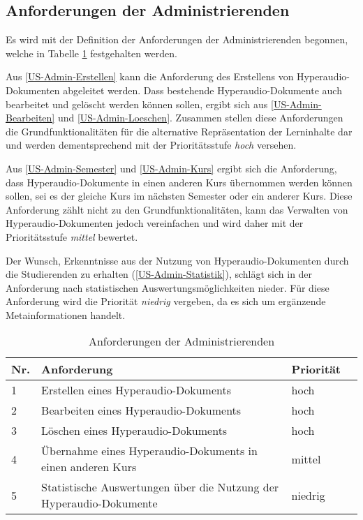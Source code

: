 \subsection{Anforderungen der Administrierenden}
Es wird mit der Definition der Anforderungen der Administrierenden begonnen, welche in Tabelle \ref{tab:AnforderungenAdministrierenden} festgehalten werden. 

Aus \ref{US-Admin-Erstellen} kann die Anforderung des Erstellens von Hyperaudio-Dokumenten abgeleitet werden. Dass bestehende Hyperaudio-Dokumente auch bearbeitet und gelöscht werden können sollen, ergibt sich aus \ref{US-Admin-Bearbeiten} und \ref{US-Admin-Loeschen}. Zusammen stellen diese Anforderungen die Grundfunktionalitäten für die alternative Repräsentation der Lerninhalte dar und werden dementsprechend mit der Prioritätsstufe \textit{hoch} versehen.

Aus \ref{US-Admin-Semester} und \ref{US-Admin-Kurs} ergibt sich die Anforderung, dass Hyperaudio-Dokumente in einen anderen Kurs übernommen werden können sollen, sei es der gleiche Kurs im nächsten Semester oder ein anderer Kurs. Diese Anforderung zählt nicht zu den Grundfunktionalitäten, kann das Verwalten von Hyperaudio-Dokumenten jedoch vereinfachen und wird daher mit der Prioritätsstufe \textit{mittel} bewertet.

Der Wunsch, Erkenntnisse aus der Nutzung von Hyperaudio-Dokumenten durch die Studierenden zu erhalten (\ref{US-Admin-Statistik}), schlägt sich in der Anforderung nach statistischen Auswertungsmöglichkeiten nieder. Für diese Anforderung wird die Priorität \textit{niedrig} vergeben, da es sich um ergänzende Metainformationen handelt.

\begin{table}[!ht]
\def\arraystretch{1.4}
\caption{Anforderungen der Administrierenden}
\label{tab:AnforderungenAdministrierenden}
 \begin{tabularx}{\textwidth}{lXll}      
    \hline
    Nr. & Anforderung & Priorität
    \\\hline
    1 & Erstellen eines Hyperaudio-Dokuments & hoch\\
    2 & Bearbeiten eines Hyperaudio-Dokuments & hoch\\
    3 & Löschen eines Hyperaudio-Dokuments & hoch\\
    4 & Übernahme eines Hyperaudio-Dokuments in einen anderen Kurs & mittel\\
    5 & Statistische Auswertungen über die Nutzung der Hyperaudio-Dokumente & niedrig\\
    \hline
    \end{tabularx}
\end{table}


